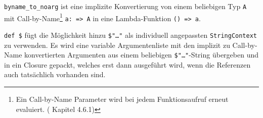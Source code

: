 \lstinline|byname_to_noarg| ist eine implizite Konvertierung von einem
beliebigen Typ \lstinline|A| mit Call-by-Name\footnote{Ein Call-by-Name
Parameter wird bei jedem Funktionsaufruf erneut evaluiert.
(\cite{scala-ref} Kapitel 4.6.1)}
\lstinline|a: => A| in eine Lambda-Funktion \lstinline|() => a|.

\lstinline|def $| fügt die Möglichkeit hinzu \lstinline|$"…"| als individuell angepassten \lstinline|StringContext| zu verwenden. Es wird eine variable 
Argumentenliste mit den implizit zu Call-by-Name konvertierten Argumenten
aus einem beliebigen \lstinline|$"…"|-String übergeben und in ein Closure gepackt,
welches erst dann ausgeführt wird, wenn die Referenzen auch tatsächlich
vorhanden sind.
